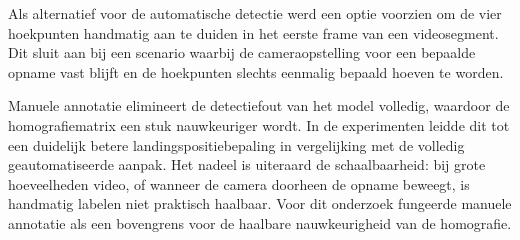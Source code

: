 Als alternatief voor de automatische detectie werd een optie voorzien om de vier hoekpunten handmatig aan te duiden in het eerste frame van een videosegment. Dit sluit aan bij een scenario waarbij de cameraopstelling voor een bepaalde opname vast blijft en de hoekpunten slechts eenmalig bepaald hoeven te worden.

Manuele annotatie elimineert de detectiefout van het model volledig, waardoor de homografiematrix een stuk nauwkeuriger wordt. In de experimenten leidde dit tot een duidelijk betere landingspositiebepaling in vergelijking met de volledig geautomatiseerde aanpak. Het nadeel is uiteraard de schaalbaarheid: bij grote hoeveelheden video, of wanneer de camera doorheen de opname beweegt, is handmatig labelen niet praktisch haalbaar. Voor dit onderzoek fungeerde manuele annotatie als een bovengrens voor de haalbare nauwkeurigheid van de homografie.
